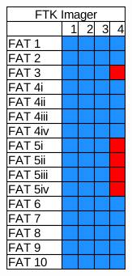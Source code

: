 \begin{figure}
\begin{subfigure}{0.16\linewidth}
    \end{subfigure}
    \begin{subfigure}{0.16\linewidth}
        \includegraphics[width=\linewidth]{fig/ftk_results_fat.png}

\end{subfigure}
\end{figure}
